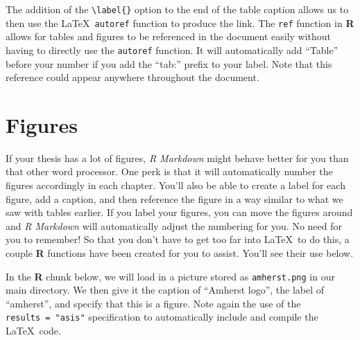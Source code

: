 \documentclass[12pt,twoside]{amherstthesis}
\begin{document}
  The addition of the \texttt{\textbackslash{}label\{\}} option to the end
  of the table caption allows us to then use the \LaTeX~\texttt{autoref}
  function to produce the link. The \texttt{ref} function in \textbf{R}
  allows for tables and figures to be referenced in the document easily
  without having to directly use the \texttt{autoref} function. It will
  automatically add ``Table'' before your number if you add the ``tab:''
  prefix to your label. Note that this reference could appear anywhere
  throughout the document.
  
  \clearpage
  
  \section{Figures}\label{figures}
  
  If your thesis has a lot of figures, \emph{R Markdown} might behave
  better for you than that other word processor. One perk is that it will
  automatically number the figures accordingly in each chapter. You'll
  also be able to create a label for each figure, add a caption, and then
  reference the figure in a way similar to what we saw with tables
  earlier. If you label your figures, you can move the figures around and
  \emph{R Markdown} will automatically adjust the numbering for you. No
  need for you to remember! So that you don't have to get too far into
  \LaTeX~to do this, a couple \textbf{R} functions have been created for
  you to assist. You'll see their use below.
  
  In the \textbf{R} chunk below, we will load in a picture stored as
  \texttt{amherst.png} in our main directory. We then give it the caption
  of ``Amherst logo'', the label of ``amherst'', and specify that this is
  a figure. Note again the use of the \texttt{results\ =\ "asis"}
  specification to automatically include and compile the \LaTeX~code.
  
  \begin{Shaded}
  \begin{Highlighting}[]
  \NormalTok{(} \NormalTok{, } \NormalTok{, }
         \NormalTok{, } \NormalTok{)}
  \end{Highlighting}
  \end{Shaded}
  
\end{document}
